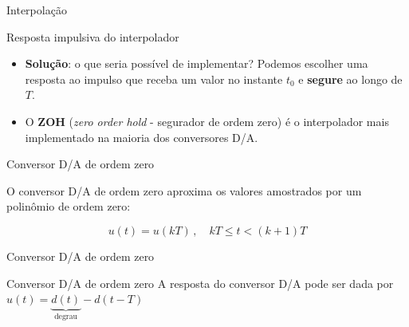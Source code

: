 \begin{frame}{Interpolação}
\begin{block}{Resposta impulsiva do interpolador}
\begin{itemize}
    \item \textbf{Solução}: o que seria possível de implementar? Podemos escolher uma resposta ao impulso que receba um valor no instante $t_0$ e \textbf{segure} ao longo de $T$.
    \item O \textbf{ZOH} (\textit{zero order hold} - segurador de ordem zero) é o interpolador mais implementado na maioria dos conversores D/A.
\end{itemize}
\end{block}
\end{frame}

\begin{frame}{Conversor D/A de ordem zero}
\begin{block}{}
O conversor D/A de ordem zero aproxima os valores amostrados por um polinômio de ordem zero:
\end{block}
\begin{minipage}{0.45\linewidth}
	\centering
	\scalebox{0.8}{
		}
\end{minipage}
\hfill
\begin{minipage}{0.45\linewidth}
	\centering
	\scalebox{0.8}{
		}
\end{minipage}


\[ u(t)=u(kT)\, ,\quad kT\leqslant t<(k+1)T \]
\end{frame}


\begin{frame}{Conversor D/A de ordem zero}
\begin{minipage}{0.45\linewidth}
	\centering
	\scalebox{0.8}{
		}
\end{minipage}
\hfill
\begin{minipage}{0.45\linewidth}
	\centering
	\scalebox{0.8}{
		
		}
\end{minipage}


\begin{block}{Conversor D/A de ordem zero}
	A resposta do conversor D/A pode ser dada por $ u(t)=\underbrace{d(t)}_{\text{degrau}}{}-d(t-T) $
\end{block}
\end{frame}


